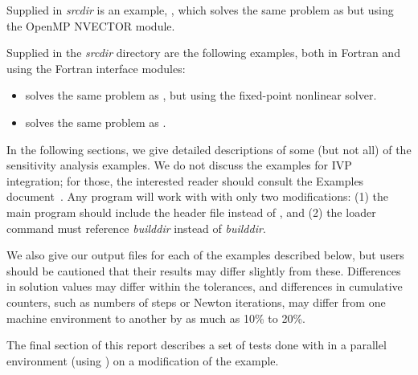 
\vspace{0.2in}\noindent 
Supplied in {\em srcdir} is
an example, , which solves the same problem as
 but using the OpenMP NVECTOR module.


\vspace{0.2in}\noindent Supplied in the
{\em srcdir} directory are the
following examples, both in Fortran and using the {\sundials} Fortran
interface modules:
\begin{itemize}
\item {} solves the same problem as
  , but using the fixed-point nonlinear solver.
\item {} solves the same problem as
  .
\end{itemize}


\vspace{0.2in}\noindent
In the following sections, we give detailed descriptions of some (but
not all) of the sensitivity analysis examples. We do not discuss the 
examples for IVP integration; for those, the interested reader should consult
the {\cvode} Examples document~\cite{cvode_ex}. Any {\cvode} program
will work with {\cvodes} with only two modifications: (1) the main program
should include the header file  instead of , and
(2) the loader command must reference
{\em builddir} instead of
{\em builddir}.

We also give our output files for each of the examples described below, 
but users should be cautioned that their
results may differ slightly from these.  Differences in solution
values may differ within the tolerances, and differences in cumulative
counters, such as numbers of steps or Newton iterations, may differ
from one machine environment to another by as much as 10\% to 20\%.

The final section of this report describes a set of tests done with
{\cvodes} in a parallel environment (using {\nvecp}) on a modification of
the  example.

